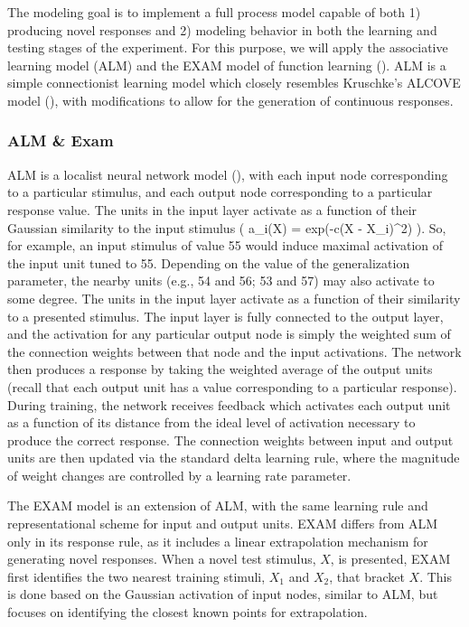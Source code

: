 \documentclass[
  11pt,
  letterpaper,
]{article}
\begin{document}
The modeling goal is to implement a full process model capable of both
1) producing novel responses and 2) modeling behavior in both the
learning and testing stages of the experiment. For this purpose, we will
apply the associative learning model (ALM) and the EXAM model of
function learning (). ALM is a simple connectionist learning model which
closely resembles Kruschke's ALCOVE model
(), with modifications to allow for the generation of continuous
responses.

\subsubsection{ALM \& Exam}\label{alm-exam}

ALM is a localist neural network model
(),
with each input node corresponding to a particular stimulus, and each
output node corresponding to a particular response value. The units in
the input layer activate as a function of their Gaussian similarity to
the input stimulus ( a\_i(X) = exp(-c(X - X\_i)\^{}2) ). So, for
example, an input stimulus of value 55 would induce maximal activation
of the input unit tuned to 55. Depending on the value of the
generalization parameter, the nearby units (e.g., 54 and 56; 53 and 57)
may also activate to some degree. The units in the input layer activate
as a function of their similarity to a presented stimulus. The input
layer is fully connected to the output layer, and the activation for any
particular output node is simply the weighted sum of the connection
weights between that node and the input activations. The network then
produces a response by taking the weighted average of the output units
(recall that each output unit has a value corresponding to a particular
response). During training, the network receives feedback which
activates each output unit as a function of its distance from the ideal
level of activation necessary to produce the correct response. The
connection weights between input and output units are then updated via
the standard delta learning rule, where the magnitude of weight changes
are controlled by a learning rate parameter.

The EXAM model is an extension of ALM, with the same learning rule and
representational scheme for input and output units. EXAM differs from
ALM only in its response rule, as it includes a linear extrapolation
mechanism for generating novel responses. When a novel test stimulus,
\(X\), is presented, EXAM first identifies the two nearest training
stimuli, \(X_1\) and \(X_2\), that bracket \(X\). This is done based on
the Gaussian activation of input nodes, similar to ALM, but focuses on
identifying the closest known points for extrapolation.
\end{document}
